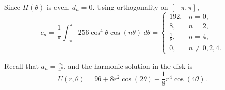 \documentclass{article} %
\begin{document}
Since $H(\theta)$ is even, $d_n = 0$. Using orthogonality on
$[-\pi,\pi]$,
\[
  c_n = \frac{1}{\pi}\int_{-\pi}^{\pi}256\cos^4\theta\cos(n\theta)\,d\theta
  =
  \begin{cases}
    192, & n = 0,\\
    8, & n = 2,\\
    \frac{1}{8}, & n = 4,\\
    0, & n \ne 0,2,4.
  \end{cases}
\]

Recall that $a_n = \frac{c_n}{4^n}$, and the harmonic solution in the disk is
\[
  U(r,\theta) = 96 + 8r^2\cos(2\theta) + \frac{1}{8}r^4\cos(4\theta).
\]
\end{document}
